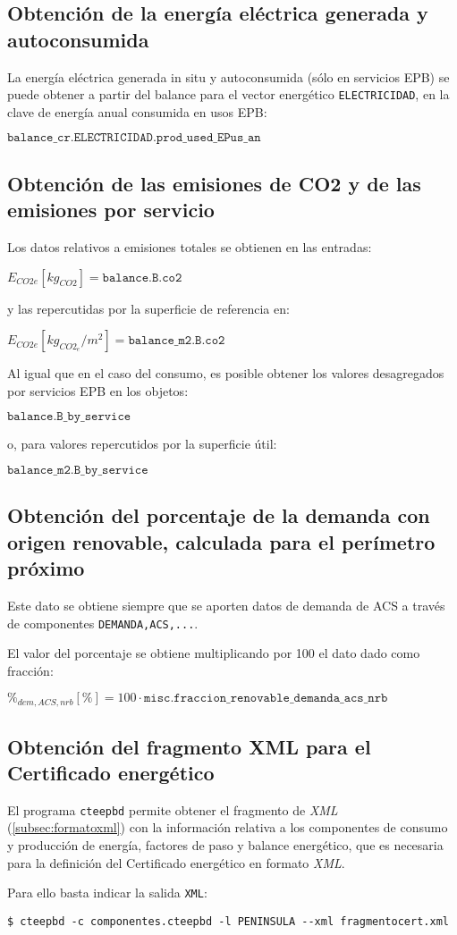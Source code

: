 \documentclass[10pt,notitlepage,oneside,a4paper]{article}
\begin{document}
\subsection{Obtención de la energía eléctrica generada y autoconsumida}

La energía eléctrica generada in situ y autoconsumida (sólo en servicios EPB) se puede obtener a partir del balance para el vector energético \texttt{ELECTRICIDAD}, en la clave de energía anual consumida en usos EPB:

$\texttt{balance\_cr.ELECTRICIDAD.prod\_used\_EPus\_an}$

\subsection{Obtención de las emisiones de CO2 y de las emisiones por servicio}

Los datos relativos a emisiones totales se obtienen en las entradas:

$E_{CO2e} [kg_{CO2}] = \texttt{balance.B.co2}$

y las repercutidas por la superficie de referencia en:

$E_{CO2e} [kg_{CO2_e}/m^2] = \texttt{balance\_m2.B.co2}$

Al igual que en el caso del consumo, es posible obtener los valores desagregados por servicios EPB en los objetos:

$\texttt{balance.B\_by\_service}$

o, para valores repercutidos por la superficie útil:

$\texttt{balance\_m2.B\_by\_service}$

\subsection{Obtención del porcentaje de la demanda con origen renovable, calculada para el perímetro próximo}

Este dato se obtiene siempre que se aporten datos de demanda de ACS a través de componentes \texttt{DEMANDA,ACS,...}.

El valor del porcentaje se obtiene multiplicando por 100 el dato dado como fracción:

$\%_{dem,ACS,nrb} [\%] = 100 \cdot \texttt{misc.fraccion\_renovable\_demanda\_acs\_nrb}$


\subsection{Obtención del fragmento XML para el Certificado energético}

El programa \texttt{cteepbd} permite obtener el fragmento de \textit{XML} (\autoref{subsec:formatoxml}) con la información relativa a los componentes de consumo y producción de energía, factores de paso y balance energético, que es necesaria para la definición del Certificado energético en formato \textit{XML}.

Para ello basta indicar la salida \texttt{XML}:

\begin{Verbatim}[fontsize=\small]
    $ cteepbd -c componentes.cteepbd -l PENINSULA --xml fragmentocert.xml
\end{Verbatim}
\end{document}
